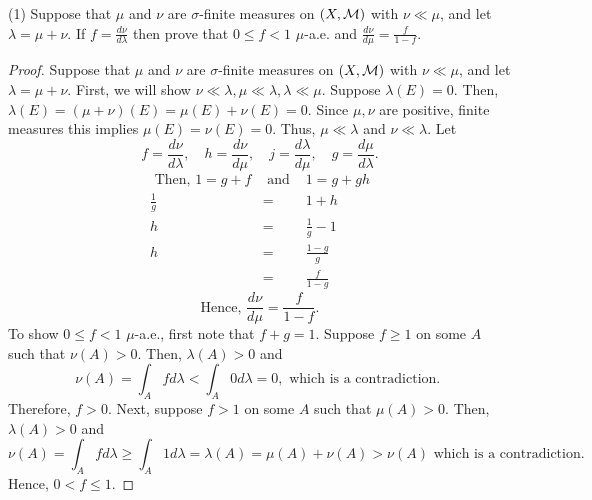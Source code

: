 (1) Suppose that $\mu$ and $\nu$ are $\sigma$-finite measures on $(X, {\mathcal M})$ with $\nu \ll \mu$, and let $\lambda = \mu + \nu$. If $f = \frac{d \nu}{d \lambda}$ then prove that $0 \leq f < 1$ $\mu$-a.e. and $\frac{d \nu}{d \mu}=\frac{f}{1-f}$.\\
\begin{proof}
	Suppose that $\mu$ and $\nu$ are $\sigma$-finite measures on $(X, {\mathcal M})$ with $\nu \ll \mu$, and let $\lambda = \mu + \nu$. First, we will show $\nu \ll \lambda , \mu \ll \lambda , \lambda \ll \mu$. Suppose $\lambda(E) = 0$. Then, $\lambda(E)= (\mu + \nu)(E) = \mu(E) + \nu(E) = 0 $. Since $\mu, \nu$ are positive, finite measures this implies $\mu(E) = \nu(E) = 0$. Thus, $\mu \ll \lambda$ and $\nu \ll \lambda$. 
	 Let \[
f = \frac{d \nu}{d \lambda }, \quad h = \frac{d \nu}{d \mu}, \quad j = \frac{d \lambda}{d \mu}, \quad g =\frac{d \mu}{d \lambda}.
	\] 
	\begin{eqnarray*}
\text{ Then, } 1 = g + f & \text{ and } & 1 = g + gh \\
	\frac{1}{g} & = & 1 + h \\
	h & = & \frac{1}{g} - 1 \\
	h & = & \frac{1-g}{g}\\
	& = & \frac{f}{1-g}
	\end{eqnarray*}
\[
\text{Hence, } \frac{d \nu}{d \mu}=\frac{f}{1-f}.
\]
To show $0 \leq f < 1$ $\mu$-a.e., first note that $f + g = 1$. Suppose $f \geq 1$ on some $A$ such that $\nu(A)>0$. Then, $\lambda(A)>0$ and
\[
 \nu(A) = \int_A f d \lambda < \int_A 0 d \lambda = 0, \text{ which is a contradiction. }
\]
Therefore, $f>0$. Next, suppose $f>1$ on some $A$ such that $\mu(A)>0$. Then, $\lambda(A)>0$ and 
\[
\nu(A) = \int_A f d \lambda \geq \int_A 1 d \lambda = \lambda(A) = \mu(A) + \nu(A)> \nu(A) \text{ which is a contradiction.}
\]
Hence, $0< f \leq 1$. 
\end{proof}
